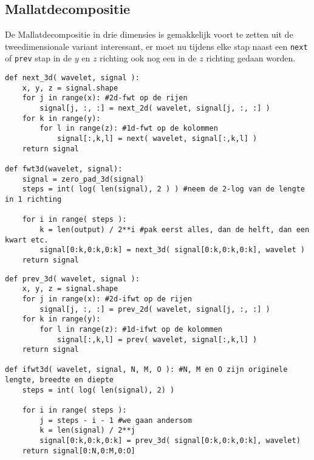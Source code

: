 \subsection{Mallatdecompositie}
De Mallatdecompositie in drie dimensies is gemakkelijk voort te zetten uit de tweedimensionale variant interessant,
er moet nu tijdens elke stap naast een \texttt{next} of \texttt{prev} stap in de $y$ en $z$ richting ook nog een 
in de $z$ richting gedaan worden. 
\begin{lstlisting}[caption=De Mallatdecompositie in 3 dimensies]
def next_3d( wavelet, signal ):
	x, y, z = signal.shape
	for j in range(x): #2d-fwt op de rijen
		signal[j, :, :] = next_2d( wavelet, signal[j, :, :] )
	for k in range(y):
		for l in range(z): #1d-fwt op de kolommen
			signal[:,k,l] = next( wavelet, signal[:,k,l] )
	return signal

def fwt3d(wavelet, signal):
	signal = zero_pad_3d(signal)
	steps = int( log( len(signal), 2 ) ) #neem de 2-log van de lengte in 1 richting
	
	for i in range( steps ):
		k = len(output) / 2**i #pak eerst alles, dan de helft, dan een kwart etc.
		signal[0:k,0:k,0:k] = next_3d( signal[0:k,0:k,0:k], wavelet )
	return signal
\end{lstlisting}
\begin{lstlisting}[caption=De omgekeerde Mallatdecompositie in 3 dimensies]
def prev_3d( wavelet, signal ):
	x, y, z = signal.shape
	for j in range(x): #2d-ifwt op de rijen
		signal[j, :, :] = prev_2d( wavelet, signal[j, :, :] )
	for k in range(y):
		for l in range(z): #1d-ifwt op de kolommen
			signal[:,k,l] = prev( wavelet, signal[:,k,l] )
	return signal

def ifwt3d( wavelet, signal, N, M, O ): #N, M en O zijn originele lengte, breedte en diepte
	steps = int( log( len(signal), 2) )
	
	for i in range( steps ):
		j = steps - i - 1 #we gaan andersom
		k = len(signal) / 2**j
		signal[0:k,0:k,0:k] = prev_3d( signal[0:k,0:k,0:k], wavelet)
	return signal[0:N,0:M,0:O]
\end{lstlisting}

